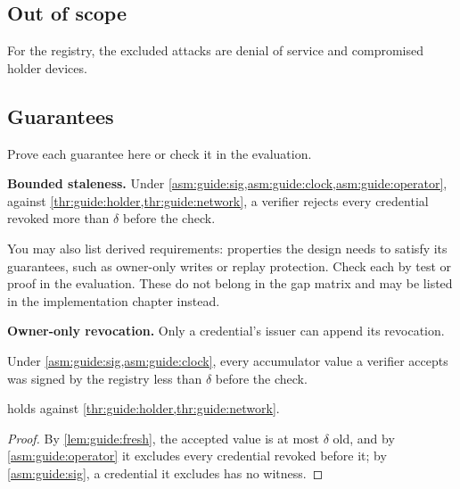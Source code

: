\subsection{Out of scope}\label{app:chapters:out-of-scope}
For the registry, the excluded attacks are denial of service and compromised holder devices.

\subsection[Guarantees]{Guarantees\skimmark}\label{app:chapters:guarantees}
Prove each guarantee here or check it in the evaluation.
\begin{guarantees}
  \item\label{g:guide:stale} \textbf{Bounded staleness.} Under \cref{asm:guide:sig,asm:guide:clock,asm:guide:operator}, against \cref{thr:guide:holder,thr:guide:network}, a verifier rejects every credential revoked more than $\delta$ before the check.
\end{guarantees}

You may also list derived requirements: properties the design needs to satisfy its guarantees, such as owner-only writes or replay protection. Check each by test or proof in the evaluation. These do not belong in the gap matrix and may be listed in the implementation chapter instead.
\begin{derivedrequirements}
  \item\label{dr:guide:owner} \textbf{Owner-only revocation.} Only a credential's issuer can append its revocation.
\end{derivedrequirements}

\begin{lemma}\label{lem:guide:fresh}
Under \cref{asm:guide:sig,asm:guide:clock}, every accumulator value a verifier accepts was signed by the registry less than $\delta$ before the check.
\end{lemma}
\begin{theorem}\label{thm:guide:stale}
 holds against \cref{thr:guide:holder,thr:guide:network}.
\end{theorem}
\begin{proof}
By \cref{lem:guide:fresh}, the accepted value is at most $\delta$ old, and by \cref{asm:guide:operator} it excludes every credential revoked before it; by \cref{asm:guide:sig}, a credential it excludes has no witness.
\end{proof}

